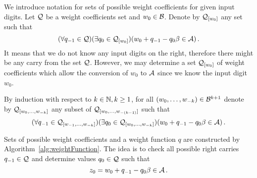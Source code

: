     We introduce notation for sets of possible weight coefficients for given input digits.
        Let $\mathcal{Q}$ be a weight coefficients set and $w_0\in \mathcal{B}$. Denote by $\mathcal{Q}_{[w_0]}$ any set such that
        $$
            (\forall q_{-1} \in \mathcal{Q})(\exists q_0 \in \mathcal{Q}_{[w_0]})(w_0 + q_{-1} - q_0 \beta \in \mathcal{A})\,.
        $$
It means that we do not know any input digits on the right, therefore there might be any carry from the set $\mathcal{Q}$. However, we may determine a set $\mathcal{Q}_{[w_0]}$ of  weight coefficients which allow the conversion of $w_0$ to $\mathcal{A}$ since we know the input digit $w_0$.
        
        By induction with respect to $k \in \mathbb{N}, k\geq 1$, for all $(w_{0}, \dots, w_{-k})\in \mathcal{B}^{k+1}$ denote by $\mathcal{Q}_{[w_{0}, \dots, w_{-k}]}$ any subset of  $\mathcal{Q}_{[w_{0}, \dots, w_{-(k-1)}]}$ such that 
        $$
           (\forall q_{-1} \in \mathcal{Q}_{[w_{-1}, \dots, w_{-k}]})(\exists q_0 \in \mathcal{Q}_{[w_{0}, \dots, w_{-k}]})(w_0 + q_{-1} - q_0 \beta \in \mathcal{A})\,.
        $$
        
    
 

Sets of possible weight coefficients and a weight function $q$ are constructed by Algorithm~\ref{alg:weightFunction}. The idea is to check all possible right carries $q_{-1}\in\mathcal{Q}$ and determine values $q_0\in\mathcal{Q}$ such that 
    $$
    z_0=w_0 + q_{-1} - q_0 \beta \in \mathcal{A} \,.
    $$  
    
